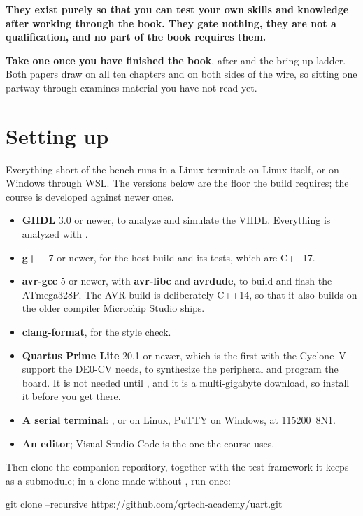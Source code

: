 \textbf{They exist purely so that you can test your own skills and knowledge after working through
the book. They gate nothing, they are not a qualification, and no part of the book requires
them.}

\textbf{Take one once you have finished the book}, after  and the bring-up ladder. Both
papers draw on all ten chapters and on both sides of the wire, so sitting one partway through
examines material you have not read yet.

\section*{Setting up}
Everything short of the bench runs in a Linux terminal: on Linux itself, or on Windows through WSL.
The versions below are the floor the build requires; the course is developed against newer ones.
\begin{itemize}
  \item \textbf{GHDL} 3.0 or newer, to analyze and simulate the VHDL. Everything is analyzed with
    .
  \item \textbf{g++} 7 or newer, for the host build and its tests, which are C++17.
  \item \textbf{avr-gcc} 5 or newer, with \textbf{avr-libc} and \textbf{avrdude}, to build and flash
    the ATmega328P. The AVR build is deliberately C++14, so that it also builds on the older
    compiler Microchip Studio ships.
  \item \textbf{clang-format}, for the style check.
  \item \textbf{Quartus Prime Lite} 20.1 or newer, which is the first with the Cyclone~V support the
    DE0-CV needs, to synthesize the peripheral and program the board. It is not needed until
    , and it is a multi-gigabyte download, so install it before you get there.
  \item \textbf{A serial terminal}: ,  or  on Linux, PuTTY
    on Windows, at 115200~8N1.
  \item \textbf{An editor}; Visual Studio Code is the one the course uses.
\end{itemize}

\noindent Then clone the companion repository, together with the test framework it keeps as a
submodule; in a clone made without , run  once:

\begin{shell}
git clone --recursive https://github.com/qrtech-academy/uart.git
\end{shell}

